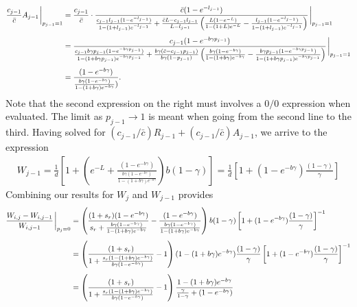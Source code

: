 \documentclass[9pt,twocolumn,twoside]{article}
\begin{document}
\begin{appendix}
\[\begin{aligned}
\frac{c_{j-1}}{\bar{c}}A_{j-1}\eval_{p_{j-1}=1} &=  \frac{c_{j-1}}{\bar{c}} \cdot \frac{\bar{c}(1-e^{-l_{j-1}})}{ \frac{c_{j-1}l_{j-1}(1-e^{-l_{j-1}})}{1-(1+l_{j-1})e^{-l_{j-1}}}+\frac{\bar{c}L-c_{j-1}l_{j-1}}{L-l_{j-1}}\left(\frac{L(1-e^{-L})}{1-(1+L)e^{-L}}-\frac{l_{j-1}(1-e^{-l_{j-1}})}{1-(1+l_{j-1})e^{-l_{j-1}}}\right)} \eval_{p_{j-1}=1}\\[4pt]
&=  \frac{c_{j-1}(1-e^{-b\gamma p_{j-1}})}{ \frac{c_{j-1}b\gamma p_{j-1}(1-e^{-b\gamma p_{j-1}})}{1-(1+b\gamma p_{j-1})e^{-b\gamma p_{j-1}}}+\frac{b\gamma(\bar{c}-c_{j-1}p_{j-1})}{b\gamma(1-p_{j-1})}\left(\frac{b\gamma(1-e^{-b\gamma})}{1-(1+b\gamma)e^{-b\gamma}}-\frac{b\gamma p_{j-1}(1-e^{-b\gamma p_{j-1}})}{1-(1+b\gamma p_{j-1})e^{-b\gamma p_{j-1}}}\right)}\eval_{p_{j-1}=1}\\[4pt]
&=  \frac{(1-e^{-b\gamma})}{ \frac{b\gamma(1-e^{-b\gamma })}{1-(1+b\gamma )e^{-b\gamma }})}.
\end{aligned}
\]
Note that the second expression on the right must involves a $0/0$ expression when evaluated. The limit as $p_{j-1}\rightarrow 1$ is meant when going from the second line to the third. Having solved for $(c_{j-1}/\bar{c})R_{j-1}+(c_{j-1}/\bar{c})A_{j-1}$, we arrive to the expression 
\begin{equation}
\begin{aligned}
W_{j-1} =\frac{1}{d}\left[1+\left(e^{-L} + \frac{(1-e^{-b\gamma})}{ \frac{b\gamma(1-e^{-b\gamma })}{1-(1+b\gamma )e^{-b\gamma }}}\right)b(1-\gamma)\right] = \frac{1}{d}\left[1+
(1-e^{-b\gamma })
\frac{(1-\gamma)}{\gamma}\right]
\end{aligned}
\end{equation}
Combining our results for $W_j$ and $W_{j-1}$ provides
\[
\begin{aligned}
\frac{W_{i,j}-W_{i,j-1}}{W_{i,j-1}}\eval_{p_j=0} &= \left( \frac{(1+s_r)(1-e^{-b\gamma})}{s_r + \frac{b\gamma(1-e^{-b\gamma})}{1-(1+b\gamma)e^{-b\gamma}}}- \frac{(1-e^{-b\gamma})}{ \frac{b\gamma(1-e^{-b\gamma })}{1-(1+b\gamma)e^{-b\gamma }}}\right) b(1-\gamma) \left[1+
(1-e^{-b\gamma })
\frac{(1-\gamma)}{\gamma}\right]^{-1}\\[4pt]
&= \left( \frac{(1+s_r)}{1 + \frac{s_r(1-(1+b\gamma)e^{-b\gamma})}{b\gamma(1-e^{-b\gamma})}}- 1\right) (1-(1+b\gamma)e^{-b\gamma })\frac{(1-\gamma)}{\gamma} \left[1+(1-e^{-b\gamma })\frac{(1-\gamma)}{\gamma}\right]^{-1}\\[4pt]
&= \left( \frac{(1+s_r)}{1 + \frac{s_r(1-(1+b\gamma)e^{-b\gamma})}{b\gamma(1-e^{-b\gamma})}}- 1\right)\frac{1-(1+b\gamma)e^{-b\gamma }}{\frac{\gamma}{1-\gamma}+(1-e^{-b\gamma })}\\[4pt]

\end{aligned}\]
\end{appendix}
\end{document}
